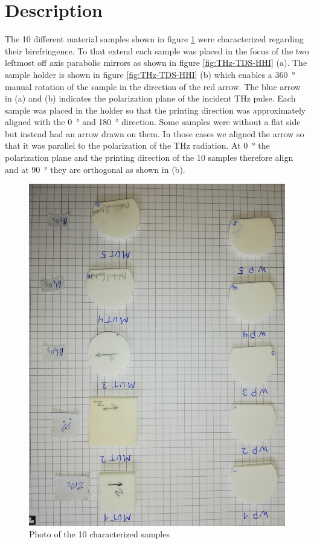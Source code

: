 \section{Description}
The 10 different material samples shown in figure \ref{fig:ceramic_samples} were characterized regarding their birefringence. To that extend each sample was placed in the focus of the two leftmost off axis parabolic mirrors as shown in figure \ref{fig:THz-TDS-HHI} (a). The sample holder is shown in figure \ref{fig:THz-TDS-HHI} (b) which enables a \SI{360}{\degree} manual rotation of the sample in the direction of the red arrow. The blue arrow in (a) and (b) indicates the polarization plane of the incident THz pulse. Each sample was placed in the holder so that the printing direction was approximately aligned with the \SI{0}{\degree} and \SI{180}{\degree} direction. Some samples were without a flat side but instead had an arrow drawn on them. In those cases we aligned the arrow so that it was parallel to the polarization of the THz radiation. At \SI{0}{\degree} the polarization plane and the printing direction of the 10 samples therefore align and at \SI{90}{\degree} they are orthogonal as shown in (b). 

\begin{figure}
    \centering
    \includegraphics[scale=0.1,angle=180,origin=c]{images/appendix/ceramic_samples.jpg}
    \caption{Photo of the 10 characterized samples}
    \label{fig:ceramic_samples}
\end{figure}


